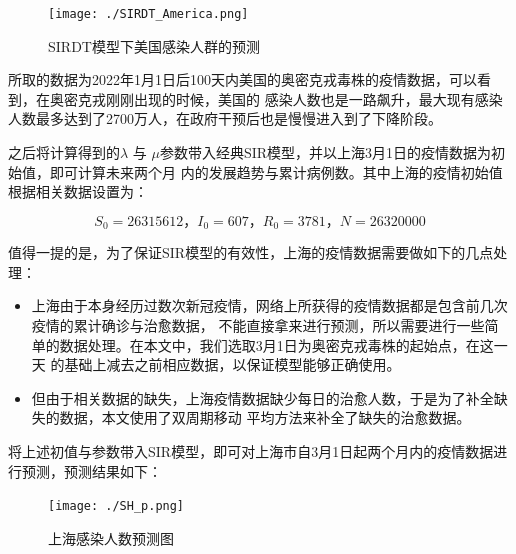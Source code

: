 \documentclass[bwprint]{gmcmthesis}
\numberwithin{figure}{section}
\begin{document}
\begin{figure}[!h]
    \centering
    \texttt{[image: ./SIRDT\_America.png]}
    \caption{SIRDT模型下美国感染人群的预测}
    \label{fig1}
\end{figure}

\par 所取的数据为2022年1月1日后100天内美国的奥密克戎毒株的疫情数据，可以看到，在奥密克戎刚刚出现的时候，美国的
感染人数也是一路飙升，最大现有感染人数最多达到了2700万人，在政府干预后也是慢慢进入到了下降阶段。
\par 之后将计算得到的$\lambda$ 与 $\mu$参数带入经典SIR模型，并以上海3月1日的疫情数据为初始值，即可计算未来两个月
内的发展趋势与累计病例数。其中上海的疫情初始值根据相关数据设置为：

\begin{equation}
    S_0=26315612\text{，}I_0=607\text{，}R_0=3781\text{，}N=26320000
\end{equation}


\par 值得一提的是，为了保证SIR模型的有效性，上海的疫情数据需要做如下的几点处理：
\begin{itemize}
    \item 上海由于本身经历过数次新冠疫情，网络上所获得的疫情数据都是包含前几次疫情的累计确诊与治愈数据，
不能直接拿来进行预测，所以需要进行一些简单的数据处理。在本文中，我们选取3月1日为奥密克戎毒株的起始点，在这一天
的基础上减去之前相应数据，以保证模型能够正确使用。
    \item 但由于相关数据的缺失，上海疫情数据缺少每日的治愈人数，于是为了补全缺失的数据，本文使用了双周期移动
平均方法来补全了缺失的治愈数据。
\end{itemize}


\par 将上述初值与参数带入SIR模型，即可对上海市自3月1日起两个月内的疫情数据进行预测，预测结果如下：

\begin{figure}[!h]
    \centering
    \texttt{[image: ./SH\_p.png]}
    \caption{上海感染人数预测图}
    \label{fig1}
\end{figure}
\end{document}
